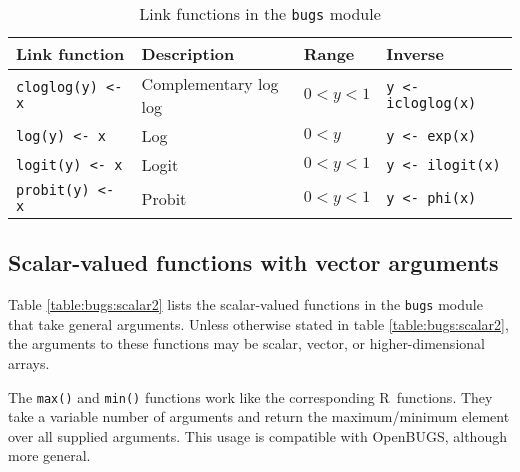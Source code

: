 \documentclass[11pt, a4paper, titlepage]{report}
\newcommand{\OpenBUGS}{\textsf{OpenBUGS}}
\newcommand{\R}{\textsf{R}}
\begin{document}
\begin{table}
\begin{center}
\begin{tabular}{llll}
\hline
Link function         & Description & Range & Inverse \\
\hline
\verb+cloglog(y) <- x+ & Complementary log log & $0 < y < 1$ & \verb+y <- icloglog(x)+ \\
\verb+log(y) <- x+    & Log           & $0 < y$ &  \verb+y <- exp(x)+ \\
\verb+logit(y) <- x+  & Logit         & $0 < y < 1$ &  \verb+y <- ilogit(x)+ \\
\verb+probit(y) <- x+ & Probit        & $0 < y < 1$ &  \verb+y <- phi(x)+\\
\hline
\end{tabular}
\caption{Link functions in the \texttt{bugs} module \label{table:bugs:link}}
\end{center}
\end{table}

\subsection{Scalar-valued functions with vector arguments}

Table \ref{table:bugs:scalar2} lists the scalar-valued functions in the
\texttt{bugs} module that take general arguments. Unless otherwise
stated in table \ref{table:bugs:scalar2}, the arguments to these functions
may be scalar, vector, or higher-dimensional arrays.

The \verb+max()+ and \verb+min()+ functions work like the
corresponding \R\ functions. They take a variable number of arguments
and return the maximum/minimum element over all supplied
arguments. This usage is  compatible with \OpenBUGS, although more general.
\end{document}
